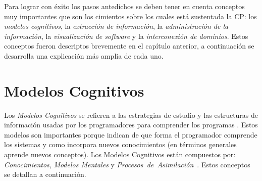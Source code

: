 Para lograr con éxito los pasos antedichos se deben tener en cuenta conceptos muy importantes que son los cimientos sobre los cuales está sustentada la CP: los \textit{modelos cognitivos}, la \textit{extracción de información}, la \textit{administración de la información}, la \textit{visualización de software} y la \textit{interconexión de dominios}. Estos conceptos fueron descriptos brevemente en el capítulo anterior, a continuación se desarrolla una explicación más amplia de cada uno.

\section{Modelos Cognitivos}

Los \textit{Modelos Cognitivos} se refieren a las estrategias de estudio y las estructuras de información usadas por los programadores para comprender los programas \cite{TIE89,VMAVA95,BROOK82,STOREY99}. Estos modelos  son importantes porque indican de que forma el programador comprende los sistemas y como incorpora nuevos conocimientos (en términos generales aprende nuevos conceptos).
Los Modelos Cognitivos están compuestos por: \textit{Conocimientos}, \textit{Modelos Mentales} y \mbox{\textit{Procesos de Asimilación} \cite{MBPHRU10}.} Estos conceptos se detallan a continuación.

